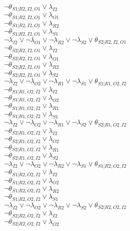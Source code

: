 $\neg\theta_{S1|R2,I2,O1} \vee \lambda_{I2}$\\
$\neg\theta_{S1|R2,I2,O1} \vee \lambda_{O1}$\\
$\neg\theta_{S1|R2,I2,O1} \vee \lambda_{R2}$\\
$\neg\theta_{S1|R2,I2,O1} \vee \lambda_{S1}$\\
$\neg\lambda_{I2} \vee \neg\lambda_{O1} \vee \neg\lambda_{R2} \vee \neg\lambda_{S2} \vee \theta_{S2|R2,I2,O1}$\\
$\neg\theta_{S2|R2,I2,O1} \vee \lambda_{I2}$\\
$\neg\theta_{S2|R2,I2,O1} \vee \lambda_{O1}$\\
$\neg\theta_{S2|R2,I2,O1} \vee \lambda_{R2}$\\
$\neg\theta_{S2|R2,I2,O1} \vee \lambda_{S2}$\\
$\neg\lambda_{I2} \vee \neg\lambda_{O2} \vee \neg\lambda_{R1} \vee \neg\lambda_{S1} \vee \theta_{S1|R1,O2,I2}$\\
$\neg\theta_{S1|R1,O2,I2} \vee \lambda_{I2}$\\
$\neg\theta_{S1|R1,O2,I2} \vee \lambda_{O2}$\\
$\neg\theta_{S1|R1,O2,I2} \vee \lambda_{R1}$\\
$\neg\theta_{S1|R1,O2,I2} \vee \lambda_{S1}$\\
$\neg\lambda_{I2} \vee \neg\lambda_{O2} \vee \neg\lambda_{R1} \vee \neg\lambda_{S2} \vee \theta_{S2|R1,O2,I2}$\\
$\neg\theta_{S2|R1,O2,I2} \vee \lambda_{I2}$\\
$\neg\theta_{S2|R1,O2,I2} \vee \lambda_{O2}$\\
$\neg\theta_{S2|R1,O2,I2} \vee \lambda_{R1}$\\
$\neg\theta_{S2|R1,O2,I2} \vee \lambda_{S2}$\\
$\neg\lambda_{I2} \vee \neg\lambda_{O2} \vee \neg\lambda_{R2} \vee \neg\lambda_{S1} \vee \theta_{S1|R2,O2,I2}$\\
$\neg\theta_{S1|R2,O2,I2} \vee \lambda_{I2}$\\
$\neg\theta_{S1|R2,O2,I2} \vee \lambda_{O2}$\\
$\neg\theta_{S1|R2,O2,I2} \vee \lambda_{R2}$\\
$\neg\theta_{S1|R2,O2,I2} \vee \lambda_{S1}$\\
$\neg\lambda_{I2} \vee \neg\lambda_{O2} \vee \neg\lambda_{R2} \vee \neg\lambda_{S2} \vee \theta_{S2|R2,O2,I2}$\\
$\neg\theta_{S2|R2,O2,I2} \vee \lambda_{I2}$\\
$\neg\theta_{S2|R2,O2,I2} \vee \lambda_{O2}$\\
